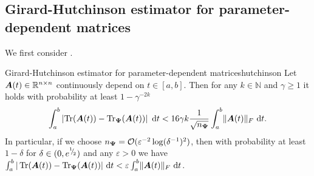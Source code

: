 \documentclass[12pt]{article}
\begin{document}
\subsection{Girard-Hutchinson estimator for parameter-dependent matrices}
\label{subsec:hutchinson}

We first consider .

\begin{theorem}{Girard-Hutchinson estimator for parameter-dependent matrices}{hutchinson}
    Let $\boldsymbol{A}(t) \in \mathbb{R}^{n \times n}$ continuously depend on $t \in [a, b]$. Then for any $k \in \mathbb{N}$ and $\gamma \geq 1$ it holds with probability at least $1 - \gamma^{-2k}$
    \begin{equation}
        \int_{a}^{b} \left| \operatorname{Tr}(\boldsymbol{A}(t)) - \operatorname{Tr}_{\boldsymbol{\Psi}}(\boldsymbol{A}(t)) \right| ~\mathrm{d}t < 16 \gamma k \frac{1}{\sqrt{n_{\boldsymbol{\Psi}}}} \int_{a}^{b} \lVert \boldsymbol{A}(t) \rVert _F  ~\mathrm{d}t.
    \end{equation}
    In particular, if we choose $n_{\boldsymbol{\Psi}} = \mathcal{O}(\varepsilon^{-2} \log(\delta^{-1})^2)$, then with probability at least $1-\delta$ for $\delta \in (0, e^{{}^{1}{\mskip -5mu/\mskip -3mu}_{2}})$ and any $\varepsilon > 0$ we have $\int_{a}^{b} | \operatorname{Tr}(\boldsymbol{A}(t)) - \operatorname{Tr}_{\boldsymbol{\Psi}}(\boldsymbol{A}(t)) | ~\mathrm{d}t < \varepsilon \int_{a}^{b} \lVert \boldsymbol{A}(t) \rVert _F~\mathrm{d}t$.
\end{theorem}
\end{document}
